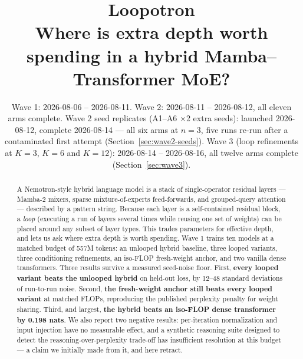 \documentclass[11pt,a4paper]{article}
\title{\textbf{Loopotron}\\[0.3em]
\large Where is extra depth worth spending in a hybrid Mamba--Transformer MoE?}
\author{}
\date{Wave 1: 2026-08-06 -- 2026-08-11. Wave 2: 2026-08-11 -- 2026-08-12, all eleven arms complete.
Wave 2 seed replicates (A1--A6 $\times$2 extra seeds): launched 2026-08-12, complete 2026-08-14 ---
all six arms at $n=3$, five runs re-run after a contaminated first attempt
(Section~\ref{sec:wave2-seeds}). Wave 3 (loop refinements at $K{=}3$, $K{=}6$ and $K{=}12$):
2026-08-14 -- 2026-08-16, all twelve arms complete (Section~\ref{sec:wave3}).}
\begin{document}
\maketitle

\begin{abstract}
\noindent
A Nemotron-style hybrid language model is a stack of single-operator residual layers --- Mamba-2
mixers, sparse mixture-of-experts feed-forwards, and grouped-query attention --- described by a
pattern string. Because each layer is a self-contained residual block, a \emph{loop} (executing a
run of layers several times while reusing one set of weights) can be placed around any subset of
layer types. This trades parameters for effective depth, and lets us ask where extra depth is worth
spending. Wave 1 trains ten models at a matched budget of 557M tokens: an unlooped hybrid baseline,
three looped variants, three conditioning refinements, an iso-FLOP fresh-weight anchor, and two
vanilla dense transformers. Three results survive a measured seed-noise floor. First, \textbf{every
looped variant beats the unlooped hybrid} on held-out loss, by 12--48 standard deviations of
run-to-run noise. Second, \textbf{the fresh-weight anchor still beats every looped variant} at
matched FLOPs, reproducing the published perplexity penalty for weight sharing. Third, and
largest, \textbf{the hybrid beats an iso-FLOP dense transformer by 0.198 nats}. We also report two
negative results: per-iteration normalization and input injection have no measurable effect, and a
synthetic reasoning suite designed to detect the reasoning-over-perplexity trade-off has
insufficient resolution at this budget --- a claim we initially made from it, and here retract.


\end{abstract}
\end{document}
